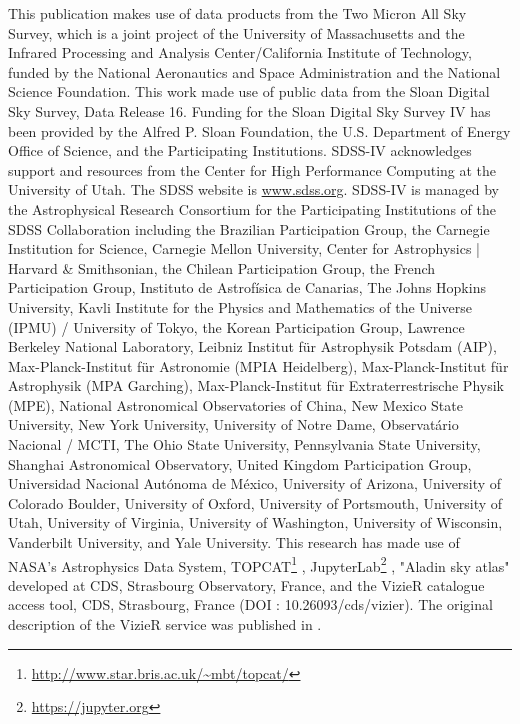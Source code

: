 \documentclass{aa}
\begin{document}
\begin{acknowledgements}
This publication makes use of data products from the Two Micron All Sky Survey, which is a joint project of the University of Massachusetts and the Infrared Processing and Analysis Center/California Institute of Technology, funded by the National Aeronautics and Space Administration and the National Science Foundation.
This work made use of public data from the Sloan Digital Sky Survey, Data Release 16. Funding for the Sloan Digital Sky Survey IV has been provided by the Alfred P. Sloan Foundation, the U.S. Department of Energy Office of Science, and the Participating Institutions. 
SDSS-IV acknowledges support and resources from the Center for High Performance Computing  at the University of Utah. The SDSS website is \url{www.sdss.org}.
SDSS-IV is managed by the Astrophysical Research Consortium for the Participating Institutions of the SDSS Collaboration including the Brazilian Participation Group, the Carnegie Institution for Science, Carnegie Mellon University, Center for Astrophysics | Harvard \& Smithsonian, the Chilean Participation Group, the French Participation Group, Instituto de Astrof\'isica de Canarias, The Johns Hopkins University, Kavli Institute for the Physics and Mathematics of the Universe (IPMU) / University of Tokyo, the Korean Participation Group, Lawrence Berkeley National Laboratory, Leibniz Institut f\"ur Astrophysik Potsdam (AIP),  Max-Planck-Institut f\"ur Astronomie (MPIA Heidelberg), Max-Planck-Institut f\"ur Astrophysik (MPA Garching), Max-Planck-Institut f\"ur Extraterrestrische Physik (MPE), National Astronomical Observatories of China, New Mexico State University, New York University, University of Notre Dame, Observat\'ario Nacional / MCTI, The Ohio State University, Pennsylvania State University, Shanghai Astronomical Observatory, United Kingdom Participation Group, Universidad Nacional Aut\'onoma de M\'exico, University of Arizona, University of Colorado Boulder, University of Oxford, University of Portsmouth, University of Utah, University of Virginia, University of Washington, University of Wisconsin, Vanderbilt University, and Yale University.
This research has made use of NASA’s Astrophysics Data System, TOPCAT\footnote{\url{http://www.star.bris.ac.uk/~mbt/topcat/}} \citep{2005ASPC..347...29T}, JupyterLab\footnote{\url{https://jupyter.org}} \citep{jupyter}, "Aladin sky atlas" \citep[\texttt{v11.0.24};][]{2000A&AS..143...33B} developed at CDS, Strasbourg Observatory, France, and the VizieR catalogue access tool, CDS, Strasbourg, France (DOI : 10.26093/cds/vizier). The original description of the VizieR service was published in \cite{vizier}.

\end{acknowledgements}
\end{document}
